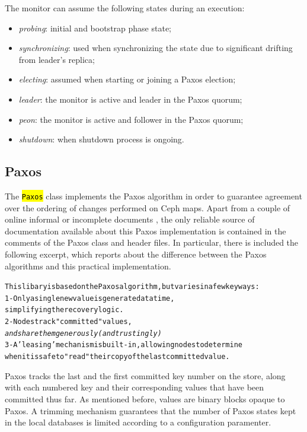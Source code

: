 \documentclass{article}
\newcommand{\hlc}[2][yellow]{\sethlcolor{#1}\hl{#2}}
\renewcommand{\c}[1]{\xspace{\small\hlc[light-gray]{\texttt{#1}}}\xspace}
\begin{document}

The monitor can assume the following states during an execution:
\begin{itemize} \itemsep1pt
\item \textit{probing}: initial and bootstrap phase state;
\item \textit{synchronizing}: used when synchronizing the state due to significant drifting from leader's replica;
\item \textit{electing}: assumed when starting or joining a Paxos election;
\item \textit{leader}: the monitor is active and leader in the Paxos quorum; 
\item \textit{peon}: the monitor is active and follower in the Paxos quorum;
\item \textit{shutdown}: when shutdown process is ongoing.
\end{itemize}


\subsection{Paxos}
The \c{Paxos} class implements the Paxos algorithm in order to guarantee agreement over the ordering of changes performed 
on Ceph maps.
Apart from a couple of online informal or incomplete documents \cite{ceph-paxos1,ceph-paxos2}, 
the only reliable source of documentation available about this Paxos implementation is contained
in the comments of the Paxos class and header files.
In particular, there is included the following excerpt, which reports about the difference between the Paxos algorithms
and this practical implementation.

\begin{alltt}
\small
This libary is based on the Paxos algorithm, but varies in a few key ways:
 1- Only a single new value is generated at a time, 
    simplifying the recovery logic.
 2- Nodes track "committed" values, 
    {\em and share them generously (and trustingly)}
 3- A 'leasing' mechanism is built-in, allowing nodes to determine 
    when it is safe to "read" their copy of the last committed value.
\end{alltt}

Paxos tracks the last and the first committed key number on the store, along with each numbered key and their 
corresponding values that have been committed thus far.
As mentioned before, values are binary blocks opaque to Paxos.
A trimming mechanism guarantees that the number of Paxos states kept in the local databases is limited
according to a configuration paramenter.
\end{document}
